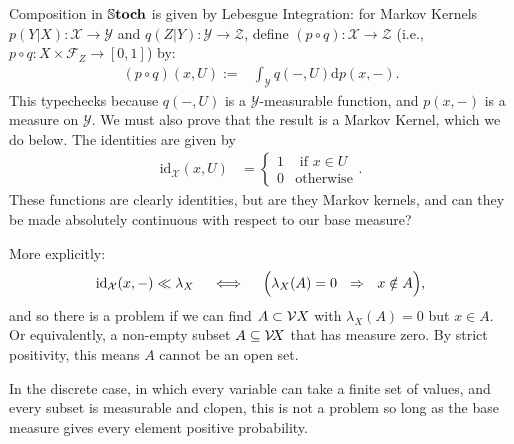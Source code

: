 \begin{defn}
    Composition in $\mathbb{S}\mathbf{toch}$ is given by Lebesgue Integration: for Markov Kernels $p(Y|X) : \mathcal X \to \mathcal Y$ and $q(Z|Y) : \mathcal Y \to \mathcal Z$, define
    $(p \circ q) : \mathcal X \to \mathcal Z$  (i.e., $p \circ q : X \times \mathcal F_Z \to [0,1]$) by:
    \begin{align*}
        (p\circ q)(x, U) :=& \int_{\mathcal Y}
            q(-, U)
            \mathrm d p(x,-).
    \end{align*}
    This typechecks because $q(-,U)$ is a $\mathcal Y$-measurable function, and $p(x,-)$ is a measure on $\mathcal Y$. 
    We must also prove that the result is a Markov Kernel, which we do below. 
    The identities are given by
    \begin{align*}
    \mathrm{id}_{\mathcal X}(x, U) &= \begin{cases}
            1 & \text{ if }x \in U \\ 0 & \text{otherwise}
        \end{cases}.
    \end{align*}
    These functions are clearly identities, but are they Markov kernels,
    and can they be made absolutely continuous with respect to our
    base measure?
    
    {\color{red}
    More explicitly:
    \[
        \mathrm{id}_{\cal X}(x,-) \ll \lambda_X
        \quad\iff\quad
        \Big( \lambda_X(A)=0 ~~\Rightarrow~~ x \notin A\Big),
    \]
    and so there is a problem if we can find $A \subset \mathcal V X$ with
    $\lambda_X(A) = 0$ but $x \in A$. Or equivalently, a non-empty
    subset $A \subseteq \mathcal V\! X$ that has measure zero. By strict positivity,
    this means $A$ cannot be an open set. 
    
    In the discrete case, in which every variable can take a finite set of values,
    and every subset is measurable and clopen, this is not a problem so long
    as the base measure gives every element positive probability.
    
    }
\end{defn}


